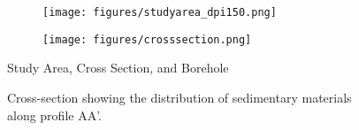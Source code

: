 \begin{figure}[H]
	\centering
	
	\begin{subfigure}[b]{0.48\textwidth}
		\centering
		\texttt{[image: figures/studyarea\_dpi150.png]}
		\label{fig:studyarea_a}
	\end{subfigure}
	\hfill
	\begin{minipage}[b]{0.48\textwidth}
		\begin{subfigure}[b]{\textwidth}
			\centering
			\texttt{[image: figures/crosssection.png]}
			\label{fig:studyarea_b}
		\end{subfigure}
		
		\vspace{0.1cm}
		
		\begin{subfigure}[b]{\textwidth}
			\centering
			\framebox{\rule{0pt}{3cm}\rule{\textwidth}{0pt}}
			\label{fig:studyarea_c}
		\end{subfigure}
		
		\vspace{0.1cm}
		
		\begin{subfigure}[b]{\textwidth}
			\centering
			\framebox{\rule{0pt}{3cm}\rule{\textwidth}{0pt}}
			\label{fig:studyarea_d}
		\end{subfigure}
	\end{minipage}
	
	\caption[Study Area]{%
		Study Area, Cross Section, and Borehole
		\label{fig:studyarea}
	}	
\end{figure}
%
%	
%	



\begin{figure}[H]
	\centering
	\framebox{\rule{0pt}{5cm}\rule{\textwidth}{0pt}}
	\captionsetup{justification=centering}
	\caption[Cross-section]{
		Cross-section showing the distribution of sedimentary materials along profile AA'.
		\label{fig:crosssection}
	}	
\end{figure}